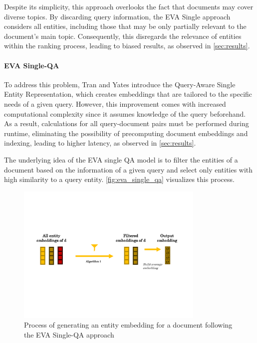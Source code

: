 Despite its simplicity, this approach overlooks the fact that documents may cover diverse topics. By discarding query information, the EVA Single approach considers all entities, including those that may be only partially relevant to the document's main topic. Consequently, this disregards the relevance of entities within the ranking process, leading to biased results, as observed in \autoref{sec:results}.

\paragraph*{EVA Single-QA}

To address this problem, Tran and Yates introduce the Query-Aware Single Entity Representation, which creates embeddings that are tailored to the specific needs of a given query.  However, this improvement comes with increased computational complexity since it assumes knowledge of the query beforehand. As a result, calculations for all query-document pairs must be performed during runtime, eliminating the possibility of precomputing document embeddings and indexing, leading to higher latency, as observed in \autoref{sec:results}.

The underlying idea of the EVA single QA model is to filter the entities of a document based on the information of a given query and select only entities with high similarity to a query entity. \autoref{fig:eva_single_qa} visualizes this process.

\begin{figure}[!htb]
    \centering
    \includegraphics[trim={1cm 6.5cm 2cm 6cm}, clip, width=0.8\textwidth]{resources/eva_single_qa} 
    \caption{Process of generating an entity embedding for a document following the EVA Single-QA approach}
    \label{fig:eva_single_qa}
\end{figure}


